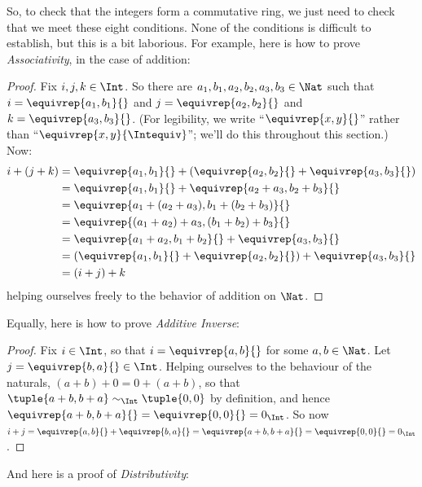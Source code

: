 So, to check that the integers form a commutative ring, we just need
to check that we meet these eight conditions. None of the conditions
is {difficult} to establish, but this is a bit laborious. For example,
here is how to prove \emph{Associativity}, in the case of addition:

\begin{proof} 
Fix $i, j, k \in \Int$. So there are $a_1, b_1, a_2, b_2, a_3, b_3 \in
\Nat$ such that $i = \equivrep{a_1, b_1}{}$ and $j =
\equivrep{a_2,b_2}{}$ and $k = \equivrep{a_3, b_3}{}$. (For
legibility, we write ``$\equivrep{x, y}{}$'' rather than
``$\equivrep{x, y}{\Intequiv}$''; we'll do this throughout this
section.) Now:
\begin{align*}
	i + (j + k) &= \equivrep{a_1, b_1}{}+(\equivrep{a_2, b_2}{} + \equivrep{a_3, b_3}{}) \\
	&= \equivrep{a_1,  b_1}{} + \equivrep{a_2+a_3, b_2+b_3}{}\\
	&= \equivrep{a_1 + (a_2 + a_3), b_1 + (b_2 + b_3)}{}\\
	&= \equivrep{(a_1 + a_2) + a_3, (b_1 + b_2) + b_3}{}\\
	&= \equivrep{a_1 + a_2, b_1 + b_2}{} + \equivrep{a_3, b_3}{}\\
	&= (\equivrep{a_1, b_1}{} + \equivrep{a_2, b_2}{}) + \equivrep{a_3, b_3}{}\\
	&= (i+j) + k
\end{align*}
helping ourselves freely to the behavior of addition on $\Nat$.
\end{proof}

Equally, here is how to prove \emph{Additive Inverse}:

\begin{proof}
Fix $i \in \Int$, so that $i = \equivrep{a,b}{}$ for some $a,b \in
\Nat$. Let $j = \equivrep{b,a}{} \in \Int$. Helping ourselves to the
behaviour of the naturals, $(a+b) + 0 = 0 + (a+b)$, so that
$\tuple{a+b, b+a} \sim_\Int \tuple{0,0}$ by definition, and hence
$\equivrep{a+b, b+a}{} = \equivrep{0, 0}{} = 0_\Int$. So now $i + j =
\equivrep{a,b}{}+\equivrep{b,a}{}=\equivrep{a+b, b+a}{}= \equivrep{0,
0}{} = 0_\Int$.
\end{proof}

And here is a proof of \emph{Distributivity}:


